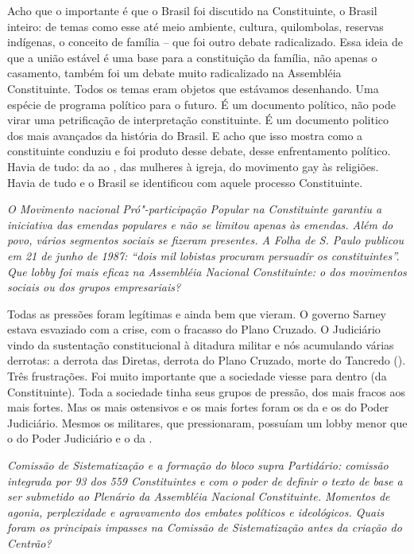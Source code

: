 Acho que o importante é que o Brasil foi discutido na Constituinte, o
Brasil inteiro: de temas como esse até meio ambiente, cultura,
quilombolas, reservas indígenas, o conceito de família -- que foi outro
debate radicalizado. Essa ideia de que a união estável é uma base para a
constituição da família, não apenas o casamento, também foi um debate
muito radicalizado na Assembléia Constituinte. Todos os temas eram
objetos que estávamos desenhando. Uma espécie de programa político para
o futuro. É um documento político, não pode virar uma petrificação de
interpretação constituinte. É um documento politico dos mais avançados
da história do Brasil. E acho que isso mostra como a constituinte
conduziu e foi produto desse debate, desse enfrentamento político. Havia
de tudo: da  ao , das mulheres à igreja, do movimento gay às
religiões. Havia de tudo e o Brasil se identificou com aquele processo
Constituinte.

\medskip

\noindent\emph{O Movimento nacional Pró"-participação Popular na Constituinte
garantiu a iniciativa das emendas populares e não se limitou apenas às
emendas. Além do povo, vários segmentos sociais se fizeram presentes. A
Folha de S. Paulo publicou em 21 de junho de 1987: ``dois mil lobistas
procuram persuadir os constituintes''. Que lobby foi mais eficaz na
Assembléia Nacional Constituinte: o dos movimentos sociais ou dos grupos
empresariais?}

Todas as pressões foram legítimas e ainda bem que
vieram. O governo Sarney estava esvaziado com a crise, com o fracasso do
Plano Cruzado. O Judiciário vindo da sustentação constitucional à
ditadura militar e nós acumulando várias derrotas: a derrota das
Diretas, derrota do Plano Cruzado, morte do Tancredo (). Três
frustrações. Foi muito importante que a sociedade viesse para dentro (da
Constituinte). Toda a sociedade tinha seus grupos de pressão, dos mais
fracos aos mais fortes. Mas os mais ostensivos e os mais fortes foram os
da  e os do Poder Judiciário. Mesmos os militares, que pressionaram,
possuíam um lobby menor que o do Poder Judiciário e o da .

\medskip

\noindent\emph{Comissão de Sistematização e a formação do bloco supra
Partidário: comissão integrada por 93 dos 559 Constituintes e com o
poder de definir o texto de base a ser submetido ao Plenário da
Assembléia Nacional Constituinte. Momentos de agonia, perplexidade e
agravamento dos embates políticos e ideológicos. Quais foram os
principais impasses na Comissão de Sistematização antes da criação do
Centrão?}

